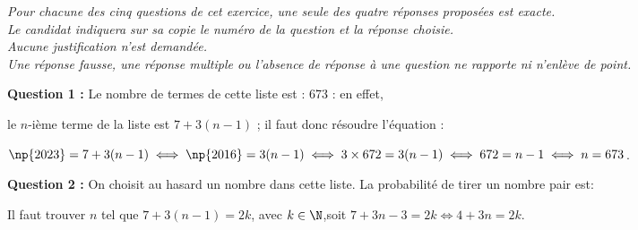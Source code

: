 
\medskip

\emph{Pour chacune des cinq questions de cet exercice, une seule des quatre réponses proposées est exacte.\\Le candidat indiquera sur sa copie le numéro de la question et la réponse choisie.\\
Aucune justification n'est demandée.\\
Une réponse fausse, une réponse multiple ou l'absence de réponse à une question ne rapporte ni n'enlève de point.}

\medskip

%

\textbf{Question 1 :} Le nombre de termes de cette liste est : 673 : en effet,

le $n$-ième terme de la liste est $7 + 3(n - 1)$ ; il faut donc résoudre l'équation :

$\np{2023} = 7 + 3(n - 1) \iff \np{2016} = 3(n - 1) \iff 3 \times 672 = 3(n - 1) \iff 672 = n - 1 \iff n = 673$.

\textbf{Question 2 :} On choisit au hasard un nombre dans cette liste. La probabilité de tirer un nombre pair est:

Il faut trouver $n$ tel que $7 + 3(n - 1) = 2k$, avec $k \in \N$,soit $7 + 3n - 3 = 2k \iff 4 + 3n = 2k$.

